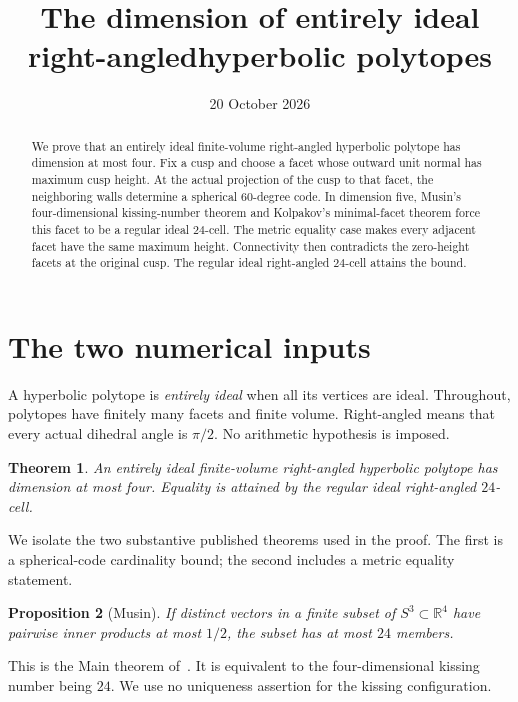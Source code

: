 \documentclass[11pt]{article}
\title{The dimension of entirely ideal right-angled\linebreak hyperbolic polytopes}
\author{}
\date{20 October 2026}
\newtheorem{theorem}{Theorem}
\newtheorem{proposition}[theorem]{Proposition}
\theoremstyle{remark}
\newcommand{\RR}{\mathbb R}
\begin{document}
\maketitle
\begin{abstract}
We prove that an entirely ideal finite-volume right-angled hyperbolic
polytope has dimension at most four. Fix a cusp and choose a facet
whose outward unit normal has maximum cusp height. At the actual
projection of the cusp to that facet, the neighboring walls determine
a spherical $60$-degree code. In dimension five, Musin's
four-dimensional kissing-number theorem and Kolpakov's minimal-facet
theorem force this facet to be a regular ideal $24$-cell. The metric
equality case makes every adjacent facet have the same maximum height.
Connectivity then contradicts the zero-height facets at the original
cusp. The regular ideal right-angled $24$-cell attains the bound.
\end{abstract}

\section{The two numerical inputs}

A hyperbolic polytope is \emph{entirely ideal} when all its vertices
are ideal. Throughout, polytopes have finitely many facets and finite
volume. Right-angled means that every actual dihedral angle is
$\pi/2$. No arithmetic hypothesis is imposed.

\begin{theorem}\label{thm:main}
An entirely ideal finite-volume right-angled hyperbolic polytope has
dimension at most four. Equality is attained by the regular ideal
right-angled $24$-cell.
\end{theorem}

We isolate the two substantive published theorems used in the proof.
The first is a spherical-code cardinality bound; the second includes
a metric equality statement.

\begin{proposition}[Musin]\label{prop:musin}
If distinct vectors in a finite subset of $S^3\subset\RR^4$ have
pairwise inner products at most $1/2$, the subset has at most $24$
members.
\end{proposition}

This is the Main theorem of~\cite[p.~4]{Musin}. It is equivalent to
the four-dimensional kissing number being $24$. We use no uniqueness
assertion for the kissing configuration.
\end{document}
